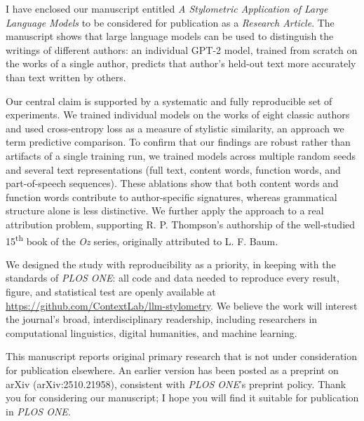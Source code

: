 \documentclass[11pt,stdletter,orderfromtodate,sigleft]{newlfm}
\begin{document}
\begin{newlfm}

I have enclosed our manuscript entitled \textit{A Stylometric Application of
Large Language Models} to be considered for publication as a \textit{Research
Article}. The manuscript shows that large language models can be used to
distinguish the writings of different authors: an individual GPT-2 model,
trained from scratch on the works of a single author, predicts that author's
held-out text more accurately than text written by others.

Our central claim is supported by a systematic and fully reproducible set of
experiments. We trained individual models on the works of eight classic authors
and used cross-entropy loss as a measure of stylistic similarity, an approach we
term predictive comparison. To confirm that our findings are robust rather than
artifacts of a single training run, we trained models across multiple random
seeds and several text representations (full text, content words, function
words, and part-of-speech sequences). These ablations show that both content
words and function words contribute to author-specific signatures, whereas
grammatical structure alone is less distinctive. We further apply the approach
to a real attribution problem, supporting R. P. Thompson's authorship of the
well-studied 15\textsuperscript{th} book of the \textit{Oz} series, originally
attributed to L. F. Baum.

We designed the study with reproducibility as a priority, in keeping with the
standards of \textit{PLOS ONE}: all code and data needed to reproduce every
result, figure, and statistical test are openly available at
\url{https://github.com/ContextLab/llm-stylometry}. We believe the work will
interest the journal's broad, interdisciplinary readership, including
researchers in computational linguistics, digital humanities, and machine
learning.

This manuscript reports original primary research that is not under
consideration for publication elsewhere. An earlier version has been posted as a
preprint on arXiv (arXiv:2510.21958), consistent with \textit{PLOS ONE}'s
preprint policy. Thank you for considering our manuscript; I hope you will find
it suitable for publication in \textit{PLOS ONE}.


\end{newlfm}
\end{document}
